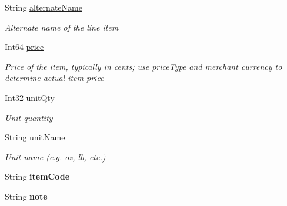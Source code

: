 \begin{DoxyCompactItemize}
String \hyperlink{classcom_1_1clover_1_1sdk_1_1v3_1_1order_1_1_line_item_ad92d1b639e56f340f573b3d8bd606bc2}{alternate\+Name}
\begin{DoxyCompactList}\small\item\em Alternate name of the line item \end{DoxyCompactList}\item 
Int64 \hyperlink{classcom_1_1clover_1_1sdk_1_1v3_1_1order_1_1_line_item_a6cc5649f0e04eadb9a99745e5234ba59}{price}
\begin{DoxyCompactList}\small\item\em Price of the item, typically in cents; use price\+Type and merchant currency to determine actual item price \end{DoxyCompactList}\item 
Int32 \hyperlink{classcom_1_1clover_1_1sdk_1_1v3_1_1order_1_1_line_item_a92ddb3af9ce72f7fb31afbef9a969e32}{unit\+Qty}
\begin{DoxyCompactList}\small\item\em Unit quantity \end{DoxyCompactList}\item 
String \hyperlink{classcom_1_1clover_1_1sdk_1_1v3_1_1order_1_1_line_item_a6dc74dc1423afa31c2be208f4ab525d8}{unit\+Name}
\begin{DoxyCompactList}\small\item\em Unit name (e.\+g. oz, lb, etc.) \end{DoxyCompactList}\item 
\mbox{\label{classcom_1_1clover_1_1sdk_1_1v3_1_1order_1_1_line_item_a0b8291a33c76f6f1489156e7eaf58c3a}} 
String {\bfseries item\+Code}
\item 
\mbox{\label{classcom_1_1clover_1_1sdk_1_1v3_1_1order_1_1_line_item_a517fcf34f1f00f709c5288fd9819b11e}} 
String {\bfseries note}

\end{DoxyCompactItemize}
